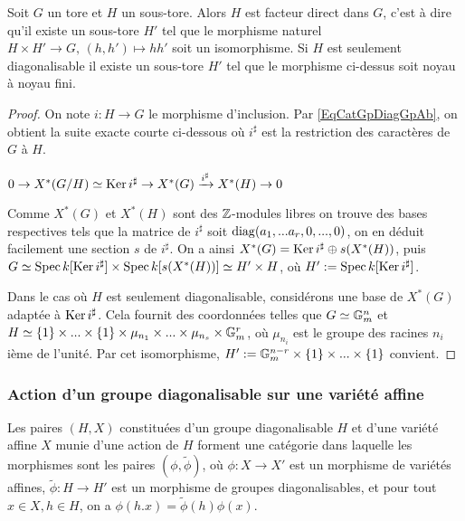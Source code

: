 \begin{prop}\label{GDiagSubtorusFacteurDirect}
Soit $G$ un tore et $H$ un sous-tore. Alors $H$ est facteur direct dans $G$, c'est à dire qu'il existe un sous-tore $H'$ tel que le morphisme naturel $H\times H'\rightarrow G,\, (h,h')\mapsto hh'$ soit un isomorphisme. Si $H$ est seulement diagonalisable il existe un sous-tore $H'$ tel que le morphisme ci-dessus soit noyau à noyau fini.
\end{prop}
\begin{proof}
On note $i:H\rightarrow G$ le morphisme d'inclusion. Par \ref{EqCatGpDiagGpAb}, on obtient la suite exacte courte ci-dessous où $i^\sharp$ est la restriction des caractères de $
G$ à $H$.
\begin{center}
$0\rightarrow X^*(G/H)\simeq\operatorname{Ker} i^\sharp\rightarrow X^*(G)\xrightarrow{i^\sharp} X^*(H)\rightarrow 0$
\end{center}
Comme $X^*(G)$ et $X^*(H)$ sont des $\mathbb{Z}$-modules libres on trouve des bases respectives tels que la matrice de $i^\sharp$ soit $\operatorname{diag}(a_1,...a_r,0,...,0)$, on en déduit facilement une section $s$ de $i^\sharp$. On a ainsi $X^*(G)=\operatorname{Ker} i^\sharp\oplus s(X^*(H))$, puis $G\simeq \operatorname{Spec} k[\operatorname{Ker} i^\sharp] \times \operatorname{Spec} k[s(X^*(H))]\simeq H'\times H$, où $H':=\operatorname{Spec} k[\operatorname{Ker} i^\sharp]$.

Dans le cas où $H$ est seulement diagonalisable, considérons une base de $X^*(G)$ adaptée à $\operatorname{Ker} i^\sharp$. Cela fournit des coordonnées telles que $G\simeq \mathbb{G}_m^n$ et $H\simeq \lbrace 1\rbrace\times...\times\lbrace 1\rbrace\times\mu_{n_1}\times...\times\mu_{n_s}\times\mathbb{G}_m^r$, où $\mu_{n_i}$ est le groupe des racines $n_i$ième de l'unité. Par cet isomorphisme, $H':=\mathbb{G}_m^{n-r}\times  \lbrace 1\rbrace\times...\times  \lbrace 1\rbrace$ convient.
\end{proof}

\subsubsection{Action d'un groupe diagonalisable sur une variété affine}

Les paires $(H, X)$ constituées d'un groupe diagonalisable $H$ et d'une variété affine $X$ munie d'une action de $H$ forment une catégorie dans laquelle les morphismes sont les paires $(\phi,\widetilde{\phi})$, où $\phi:X\rightarrow X'$ est un morphisme de variétés affines, $\widetilde{\phi}:H\rightarrow H'$ est un morphisme de groupes diagonalisables, et pour tout $x\in X, h\in H$, on a $\phi(h.x)=\widetilde{\phi}(h)\phi(x)$.

